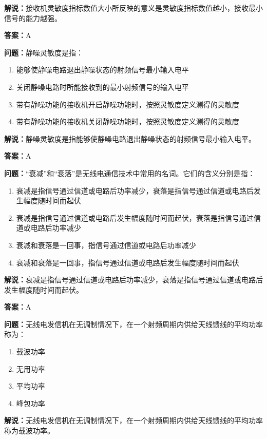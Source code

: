 \documentclass[UTF8]{ctexbook}
\begin{document}
\textbf{解说：}接收机灵敏度指标数值大小所反映的意义是灵敏度指标数值越小，接收最小信号的能力越强。%

\textbf{答案：}A

\textbf{问题：}静噪灵敏度是指：

\begin{enumerate}[label=\Alph*), leftmargin=3em]
  \item 能够使静噪电路退出静噪状态的射频信号最小输入电平
  \item 关闭静噪电路时所能接收到的最小射频信号的输入电平
  \item 带有静噪功能的接收机开启静噪功能时，按照灵敏度定义测得的灵敏度
  \item 带有静噪功能的接收机关闭静噪功能时，按照灵敏度定义测得的灵敏度
\end{enumerate}

\textbf{解说：}静噪灵敏度是指能够使静噪电路退出静噪状态的射频信号最小输入电平。%

\textbf{答案：}A

\textbf{问题：}“衰减”和“衰落”是无线电通信技术中常用的名词。它们的含义分别是指：

\begin{enumerate}[label=\Alph*), leftmargin=3em]
  \item 衰减是指信号通过信道或电路后功率减少，衰落是指信号通过信道或电路后发生幅度随时间而起伏
  \item 衰减是指信号通过信道或电路后发生幅度随时间而起伏，衰落是指信号通过信道或电路后功率减少
  \item 衰减和衰落是一回事，指信号通过信道或电路后功率减少
  \item 衰减和衰落是一回事，指信号通过信道或电路后发生幅度随时间而起伏
\end{enumerate}

\textbf{解说：}衰减是指信号通过信道或电路后功率减少，衰落是指信号通过信道或电路后发生幅度随时间而起伏。%

\textbf{答案：}A

\textbf{问题：}无线电发信机在无调制情况下，在一个射频周期内供给天线馈线的平均功率称为：

\begin{enumerate}[label=\Alph*), leftmargin=3em]
  \item 载波功率
  \item 无用功率
  \item 平均功率
  \item 峰包功率
\end{enumerate}

\textbf{解说：}无线电发信机在无调制情况下，在一个射频周期内供给天线馈线的平均功率称为载波功率。%
\end{document}

